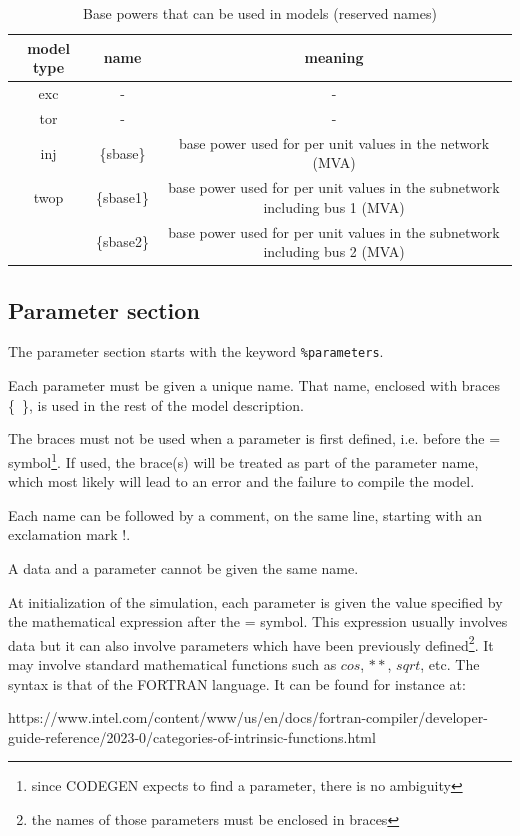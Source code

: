 \begin{table}[t]
\centering
\caption{Base powers that can be used in models (reserved names)}\label{tab-snom_in_models}
\begin{tabular}{|c|c|c|}
\hline
model type & name & meaning \\ \hline \hline
exc & - & - \\ \hline
tor & - & - \\ \hline
inj & \{sbase\} & base power used for per unit values in the network (MVA) \\ \hline
twop & \{sbase1\} & base power used for per unit values in the subnetwork including bus 1 (MVA) \\
     & \{sbase2\} & base power used for per unit values in the subnetwork including bus 2 (MVA) \\ \hline
\end{tabular}
\end{table}

\subsection{Parameter section}

The parameter section starts with the keyword {\tt \%parameters}.

Each parameter must be given a unique name. That name, enclosed with braces \{~\}, is used in the rest of the model description. 

The braces must not be used when a parameter is first defined, i.e. before the = symbol\footnote{since CODEGEN expects to find a parameter, there is no ambiguity}. If used, the brace(s) will be treated as part of the parameter name, which most likely will lead to an error and the failure to compile the model.

Each name can be followed by a comment, on the same line, starting with an exclamation mark !.

A data and a parameter cannot be given the same name.

At initialization of the simulation, each parameter is given the value specified by the mathematical expression after the = symbol. This expression usually involves data but it can also involve parameters which have been previously defined\footnote{the names of those parameters must be enclosed in braces}.
It may involve standard mathematical functions such as $cos$, $**$, $sqrt$, etc. The syntax is that of the FORTRAN language. It can be found for instance at:
 
\hspace*{-5ex}https://www.intel.com/content/www/us/en/docs/fortran-compiler/developer-guide-reference/2023-0/categories-of-intrinsic-functions.html

